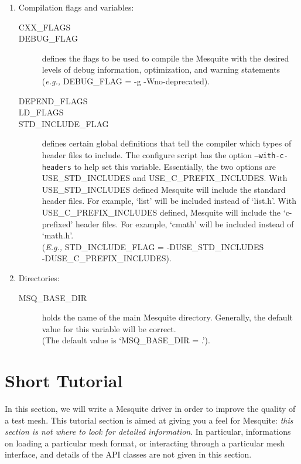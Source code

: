 \documentclass[letter]{report}
\begin{document}
\begin{enumerate}
\item Compilation flags and variables:
  \begin{description}
  \item[CXX\_FLAGS]
  \item[DEBUG\_FLAG] defines the flags to be used to compile the Mesquite
	with the desired levels of debug information, optimization, and
	warning statements\\
	({\it e.g.,} DEBUG\_FLAG = -g -Wno-deprecated).
  \item[DEPEND\_FLAGS]
  \item[LD\_FLAGS]
  \item[STD\_INCLUDE\_FLAG] defines certain global definitions that
	tell the compiler which types of header files to include. The configure script has the
	option \texttt{--with-c-headers} to help set this variable.
 	Essentially, the two options are USE\_STD\_INCLUDES and
	USE\_C\_PREFIX\_INCLUDES.  With USE\_STD\_INCLUDES defined
	Mesquite will include the standard header files.  For example,
	`list' will be included instead of `list.h'.  With
	USE\_C\_PREFIX\_INCLUDES defined, Mesquite will include the
	`c-prefixed' header files.  For example, `cmath' will be
	included instead of `math.h'.  \\
	({\it E.g.,} STD\_INCLUDE\_FLAG = -DUSE\_STD\_INCLUDES\\
	-DUSE\_C\_PREFIX\_INCLUDES).
  \end{description}
\item Directories:
  \begin{description}
  \item[MSQ\_BASE\_DIR] holds the name of the main Mesquite directory.
	Generally, the default value for this variable will be correct.\\
	(The default value is `MSQ\_BASE\_DIR = .').
  \end{description}
\end{enumerate}

\section{Short Tutorial}

In this section, we will write a Mesquite driver in order to improve the quality of a test
mesh. This tutorial section is aimed at giving you a feel for Mesquite: \emph{this section is not where to look
for detailed information}. In particular, informations on loading a particular mesh format, or
interacting through a particular mesh interface, and details of the API classes
are not given in this section.
\end{document}
